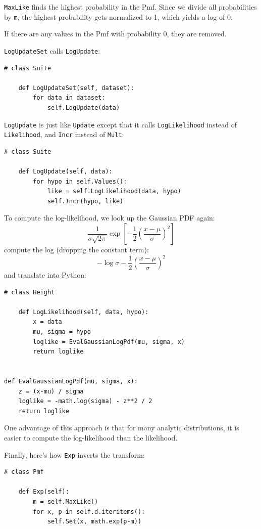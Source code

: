 \documentclass[12pt]{book}
\begin{document}
{\tt MaxLike} finds the highest probability in the Pmf.  Since we
divide all probabilities by {\tt m}, the highest probability gets
normalized to 1, which yields a log of 0.

If there are any values in the Pmf with probability 0, they are removed.

{\tt LogUpdateSet} calls {\tt LogUpdate}:

\begin{verbatim}
# class Suite

    def LogUpdateSet(self, dataset):
        for data in dataset:
            self.LogUpdate(data)
\end{verbatim}

{\tt LogUpdate} is just like {\tt Update} except that it calls
{\tt LogLikelihood} instead of {\tt Likelihood}, and {\tt Incr}
instead of {\tt Mult}:

\begin{verbatim}
# class Suite

    def LogUpdate(self, data):
        for hypo in self.Values():
            like = self.LogLikelihood(data, hypo)
            self.Incr(hypo, like)
\end{verbatim}

To compute the log-likelihood, we look up the Gaussian PDF again:
%
\[ \frac{1}{\sigma \sqrt{2 \pi}} \exp \left[ -\frac{1}{2} \left( \frac{x-\mu}{\sigma} \right)^2 \right] \]
%
compute the log (dropping the constant term):
%
\[ -\log \sigma -\frac{1}{2} \left( \frac{x-\mu}{\sigma} \right)^2 \]
%
and translate into Python:

\begin{verbatim}
# class Height

    def LogLikelihood(self, data, hypo):
        x = data
        mu, sigma = hypo
        loglike = EvalGaussianLogPdf(mu, sigma, x)
        return loglike


def EvalGaussianLogPdf(mu, sigma, x):
    z = (x-mu) / sigma
    loglike = -math.log(sigma) - z**2 / 2
    return loglike
\end{verbatim}

One advantage of this approach is that for many analytic
distributions, it is easier to compute the log-likelihood than the
likelihood.

Finally, here's how {\tt Exp} inverts the transform:

\begin{verbatim}
# class Pmf

    def Exp(self):
        m = self.MaxLike()
        for x, p in self.d.iteritems():
            self.Set(x, math.exp(p-m))
\end{verbatim}
\end{document}
